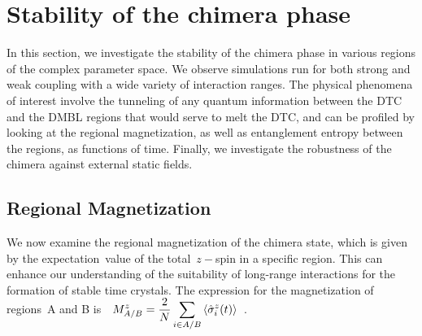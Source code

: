 \documentclass[
nofootinbib,
reprint,
superscriptaddress,
amsmath,amssymb,showkeys,
aps,
prb,
]{revtex4-2}
\begin{document}
	\section{\label{sec:level4} Stability of the chimera phase}
	In this section, we investigate the stability of the chimera phase in various regions of the complex parameter space. We observe simulations run for both strong and weak coupling with a wide variety of interaction ranges. The physical phenomena of interest involve the tunneling of any quantum information between the DTC and the DMBL regions that would serve to melt the DTC, and can be profiled by looking at the regional magnetization, as well as entanglement entropy between the regions, as functions of time. Finally, we investigate the robustness of the chimera against external static fields.
	
	\subsection{\label{sec:level42} Regional Magnetization}
	
	We now examine the regional magnetization of the chimera state, which is given by the expectation value of the total $z-$spin in a specific region. This can enhance our understanding of the suitability of long-range interactions for the formation of stable time crystals. The expression for the magnetization of regions A and B is  $\displaystyle M^z_{A/B}=\frac{2}{N}\sum_{i\in{A/B}}\expval{\hat{\sigma}^z_i(t)}$~\cite{sakurai_phys_nodate}.
	
\end{document}
